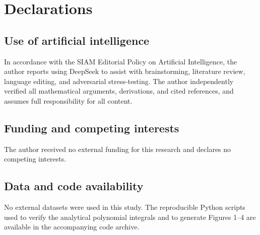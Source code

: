 \section*{Declarations}
\subsection*{Use of artificial intelligence}
In accordance with the SIAM Editorial Policy on Artificial Intelligence, the author reports using DeepSeek to assist with brainstorming, literature review, language editing, and adversarial stress-testing. The author independently verified all mathematical arguments, derivations, and cited references, and assumes full responsibility for all content.

\subsection*{Funding and competing interests}
The author received no external funding for this research and declares no competing interests.

\subsection*{Data and code availability}\label{sec:code-availability}
No external datasets were used in this study. The reproducible Python scripts used to verify the analytical polynomial integrals and to generate Figures 1--4 are available in the accompanying code archive.
